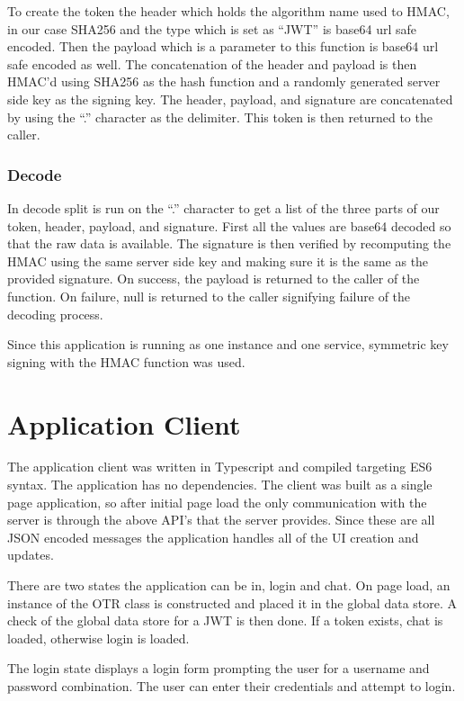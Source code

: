 To create the token the header which holds the algorithm name used to HMAC, in our case SHA256 and the type which is set as “JWT” is base64 url safe encoded. Then the payload which is a parameter to this function is base64 url safe encoded as well. The concatenation of the header and payload is then HMAC’d using SHA256 as the hash function and a randomly generated server side key as the signing key. The header, payload, and signature are concatenated by using the “.” character as the delimiter. This token is then returned to the caller.


\subsubsection{Decode}


In decode split is run on the “.” character to get a list of the three parts of our token, header, payload, and signature. First all the values are base64 decoded so that the raw data is available. The signature is then verified by recomputing the HMAC using the same server side key and making sure it is the same as the provided signature. On success, the payload is returned to the caller of the function. On failure, null is returned to the caller signifying failure of the decoding process.


Since this application is running as one instance and one service, symmetric key signing with the HMAC function was used. 


\section{Application Client}


The application client was written in Typescript and compiled targeting ES6 syntax. The application has no dependencies. The client was built as a single page application, so after initial page load the only communication with the server is through the above API’s that the server provides. Since these are all JSON encoded messages the application handles all of the UI creation and updates.


There are two states the application can be in, login and chat. On page load, an instance of the OTR class is constructed and placed it in the global data store. A check of the global data store for a JWT is then done. If a token exists, chat is loaded, otherwise login is loaded.


The login state displays a login form prompting the user for a username and password combination. The user can enter their credentials and attempt to login. 


